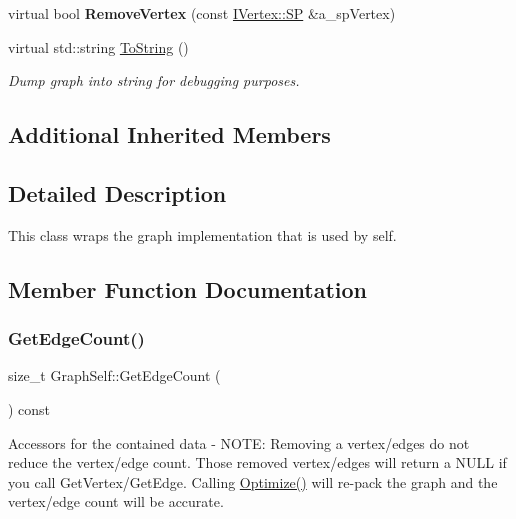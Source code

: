 \begin{DoxyCompactItemize}
\mbox{\label{class_graph_self_a08553eba89389e58348fd5923e9c8e09}} 
virtual bool {\bfseries Remove\+Vertex} (const \hyperlink{class_i_graph_1_1_i_vertex_af72b9df91f110bc7824c608c10cc819c}{I\+Vertex\+::\+SP} \&a\+\_\+sp\+Vertex)
\item 
\mbox{\label{class_graph_self_a467e165be6d2263403b5437f7df84245}} 
virtual std\+::string \hyperlink{class_graph_self_a467e165be6d2263403b5437f7df84245}{To\+String} ()
\begin{DoxyCompactList}\small\item\em Dump graph into string for debugging purposes. \end{DoxyCompactList}\end{DoxyCompactItemize}
\subsection*{Additional Inherited Members}


\subsection{Detailed Description}
This class wraps the graph implementation that is used by self. 

\subsection{Member Function Documentation}
\mbox{\label{class_graph_self_aa1514f3883bef6d823bd56d91a565b9c}} 
\subsubsection{\texorpdfstring{Get\+Edge\+Count()}{GetEdgeCount()}}
{\footnotesize\ttfamily size\+\_\+t Graph\+Self\+::\+Get\+Edge\+Count (\begin{DoxyParamCaption}{ }\end{DoxyParamCaption}) const\hspace{0.3cm}{\ttfamily [virtual]}}

Accessors for the contained data -\/ N\+O\+TE\+: Removing a vertex/edges do not reduce the vertex/edge count. Those removed vertex/edge\textquotesingle{}s will return a N\+U\+LL if you call Get\+Vertex/\+Get\+Edge. Calling \hyperlink{class_graph_self_a09c800ad3ad30f30837842aaae2497b0}{Optimize()} will re-\/pack the graph and the vertex/edge count will be accurate. 

